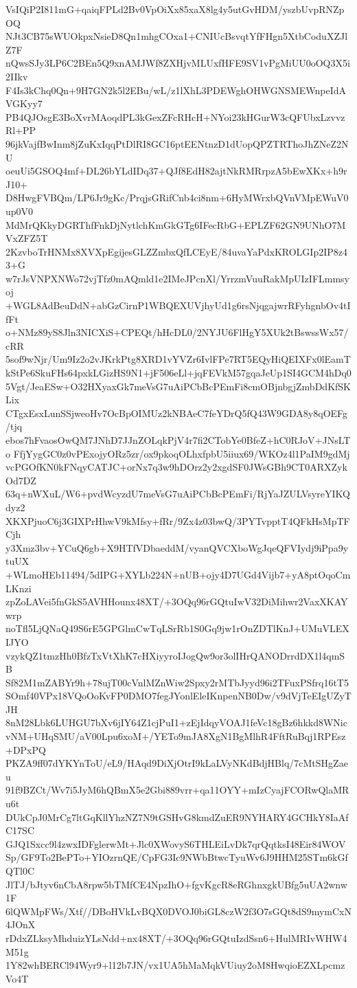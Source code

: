 VsIQiP2I811mG+qaiqFPLd2Bv0VpOiXx85xaX8lg4y5utGvHDM/yszbUvpRNZpOQ
NJt3CB75sWUOkpxNsieD8Qn1mhgCOxa1+CNIUcBsvqtYfFHgn5XtbCoduXZJlZ7F
nQwsSJy3LP6C2BEn5Q9xnAMJWf8ZXHjvMLUxfHFE9SV1vPgMiUU0oOQ3X5i2IIkv
F4Is3kChq0Qn+9H7GN2k5l2EBu/wL/z1lXhL3PDEWghOHWGNSMEWnpeIdAVGKyy7
PB4QJOsgE3BoXvrMAoqdPL3kGexZFcRHcH+NYoi23kHGurW3cQFUbxLzvvzRl+PP
96jkVajfBwInm8jZuKxIqqPtDlRI8GC16ptEENtnzD1dUopQPZTRThoJhZNeZ2NU
oeuUi5GSOQ4mf+DL26bYLdIDq37+QJf8EdH82ajtNkRMRrpzA5bEwXKx+h9rJ10+
D8HwgFVBQm/LP6Jr9gKc/PrqjsGRifCnb4ci8nm+6HyMWrxbQVnVMpEWuV0up0V0
MdMrQKkyDGRThfFnkDjNytlchKmGkGTg6IFecRbG+EPLZF62GN9UNhO7MVxZFZ5T
2KzvboTrHNMx8XVXpEgijesGLZZmbxQfLCEyE/84uvaYaPdxKROLGIp2IP8z43+G
w7rJsVNPXNWo72vjTfz0mAQmld1e2IMeJPcnXl/YrrzmVuuRakMpUIzIFLmmsyoj
+WGL8AdBeuDdN+abGzCirnP1WBQEXUVjhyUd1g6rsNjqgajwrRFyhgnbOv4tIfFt
o+NMz89yS8Jln3NICXiS+CPEQt/hHcDL0/2NYJU6FlHgY5XUk2tBswssWx57/cRR
5sof9wNjr/Um9Iz2o2vJKrkPtg8XRD1vYVZr6IvlFPe7RT5EQyHiQEIXFx0lEamT
kStPe6SkuFHs64pxkLGizHS9N1+jF506eLl+jqFEVkM57gqaJeUp1SI4GCM4hDq0
5Vgt/JeaESw+O32HXyaxGk7meVsG7uAiPCbBcPEmFi8cmOBjnbgjZmbDdKfSKLix
CTgxEsxLunSSjweoHv7OcBpOIMUz2kNBAeC7feYDrQ5fQ43W9GDA8y8qOEFg/tjq
ebos7hFvaosOwQM7JNhD7JJnZOLqkPjV4r7fi2CTobYe0BfeZ+hC0RJoV+JNsLTo
FfjYygGC0z0vPExojyORz5zr/ox9pkoqOLhxfpbU5iiux69/WKOz4l1PaIM9gdMj
vcPGOfKN0kFNqyCATJC+orNx7q3w9hDOrz2y2xgdSF0JWsGBh9CT0ARXZykOd7DZ
63q+nWXuL/W6+pvdWcyzdU7meVsG7uAiPCbBcPEmFi/RjYaJZULVsyreYIKQdyz2
XKXPjuoC6j3GIXPrHhwV9kMfsy+fRr/9Zx4z03bwQ/3PYTvpptT4QFkHsMpTFCjh
y3Xmz3bv+YCuQ6gb+X9HTfVDbaeddM/vyanQVCXboWgJqeQFVIydj9iPpa9ytuUX
+WLmoHEb11494/5dIPG+XYLb224N+nUB+ojy4D7UGd4Vijb7+yA8ptOqoCmLKnzi
zpZoLAVei5fnGkS5AVHHounx48XT/+3OQq96rGQtuIwV32DiMihwr2VaxXKAYwrp
noTfl5LjQNaQ49S6rE5GPGlmCwTqLSrRb1S0Gq9jw1rOnZDTlKnJ+UMuVLEXIJYO
vzykQZ1tmzHh0BfzTxVtXhK7cHXiyyroIJogQw9or3olIHrQANODrrdDX1l4qmSB
Sf82M1mZABYr9h+78ujT00cVnlMZnWiw2Spxy2rMTbJyyd96i2TFuxPSfrq16tT5
SOmf40VPx18VQoOoKvFP0DMO7fegJYonlEleIKnpenNB0Dw/v9dVjTeEIgUZyTJH
8nM28Lbk6LUHGU7bXv6jIY64Z1cjPuI1+zEjIdqyVOAJ1feVc18gBz6hkkd8WNic
vNM+UHqSMU/aV00Lpu6xoM+/YETo9mJA8XgN1BgMlhR4FftRuBqj1RPEsz+DPxPQ
PKZA9ff07dYKYnToU/eL9/HAqd9DiXjOtrI9kLaLVyNKdBdjHBlq/7cMtSHgZaeu
91f9BZCt/Wv7i5JyM6hQBmX5e2Gbi889vrr+qa11OYY+mIzCyajFCORwQlaMRu6t
DUkCpJ0MrCg7ltGqKllYhzNZ7N9tGSHvG8kmdZuER9NYHARY4GCHkY8IaAfC17SC
GJQ1Sxcc9l4zwxIDFglerwMt+Jlc0XWovyS6THLEiLvDk7qrQqtksI48Eir84WOV
Sp/GF9To2BePTo+YIOzrnQE/CpFG3Ic9NWbBtwcTyuWv6J9HHM25STm6kGfQTl0C
JlTJ/bJtyv6nCbA8rpw5bTMfCE4NpzIhO+fgvKgcR8eRGhnxgkUBfg5uUA2wnw1F
6lQWMpFWs/Xtf//DBoHVkLvBQX0DVOJ0biGL8czW2f3O7sGQt8dS9mymCxN4JOnX
rDdxZLksyMhduizYLsNdd+nx48XT/+3OQq96rGQtuIzdSsn6+HulMRIvWHW4M51g
1Y82whBERCl94Wyr9+l12b7JN/vx1UA5hMaMqkVUiuy2oM8HwqioEZXLpcmzVo4T
